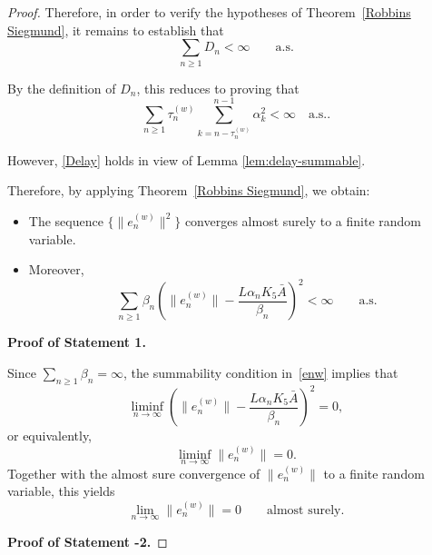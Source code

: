 \documentclass{article}
\begin{document}
\begin{proof}
Therefore, in order to verify the hypotheses of
Theorem~\ref{Robbins Siegmund}, it remains to establish that
\[
\sum_{n \ge 1} D_n < \infty
\qquad \text{a.s.}
\]

By the definition of $D_n$, this reduces to proving that
\begin{equation}
\sum\limits_{n \geq 1}\tau_n^{(w)}
\sum_{k=n-\tau_n^{(w)}}^{n-1}
\alpha_k^2
< \infty \quad \text{a.s.} .
\label{Delay}
\end{equation}

However, \eqref{Delay} holds in view of Lemma \ref{lem:delay-summable}.  

Therefore, by applying Theorem~\ref{Robbins Siegmund}, we obtain:
\begin{itemize}
    \item The sequence $\{\|e_n^{(w)}\|^2\}$ converges almost surely to a finite
    random variable.
    \item Moreover,
    \begin{equation}
        \label{enw}
        \sum_{n \ge 1}
        \beta_n
        \left(
        \|e_n^{(w)}\|
        -
        \frac{L \alpha_n K_5 \bar{A}}{\beta_n}
        \right)^2
        < \infty
        \qquad \text{a.s.}
    \end{equation}
\end{itemize}

\textbf{Proof of Statement 1.}

Since $\sum_{n \ge 1} \beta_n = \infty$, the summability condition in~\eqref{enw}
implies that
\[
    \liminf_{n \to \infty}
    \left(
    \|e_n^{(w)}\|
    -
    \frac{L \alpha_n K_5 \bar{A}}{\beta_n}
    \right)^2
    = 0,
\]
or equivalently,
\[
    \liminf_{n \to \infty} \|e_n^{(w)}\| = 0.
\]
Together with the almost sure convergence of $\|e_n^{(w)}\|$ to a finite random
variable, this yields
\[
    \lim_{n \to \infty} \|e_n^{(w)}\| = 0
    \qquad \text{almost surely}.
\]

\textbf{Proof of Statement -2.}


\end{proof}
\end{document}
